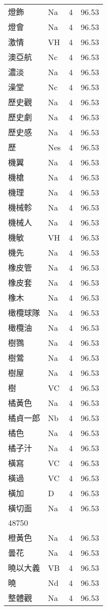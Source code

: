 \documentclass[twocolumn]{book}
\begin{document}
\begin{supertabular}{llrr}
燈飾 & Na & 4 &  96.53\\
燈會 & Na & 4 &  96.53\\
激情 & VH & 4 &  96.53\\
澳亞航 & Nc & 4 &  96.53\\
濃淡 & Na & 4 &  96.53\\
澡堂 & Nc & 4 &  96.53\\
歷史觀 & Na & 4 &  96.53\\
歷史劇 & Na & 4 &  96.53\\
歷史感 & Na & 4 &  96.53\\
歷 & Nes & 4 &  96.53\\
機翼 & Na & 4 &  96.53\\
機槍 & Na & 4 &  96.53\\
機理 & Na & 4 &  96.53\\
機械軫 & Na & 4 &  96.53\\
機械人 & Na & 4 &  96.53\\
機敏 & VH & 4 &  96.53\\
機先 & Na & 4 &  96.53\\
橡皮管 & Na & 4 &  96.53\\
橡皮套 & Na & 4 &  96.53\\
橡木 & Na & 4 &  96.53\\
橄欖球隊 & Na & 4 &  96.53\\
橄欖油 & Na & 4 &  96.53\\
樹鷚 & Na & 4 &  96.53\\
樹鶯 & Na & 4 &  96.53\\
樹屋 & Na & 4 &  96.53\\
樹 & VC & 4 &  96.53\\
橘黃色 & Na & 4 &  96.53\\
橘貞一郎 & Nb & 4 &  96.53\\
橘色 & Na & 4 &  96.53\\
橘子汁 & Na & 4 &  96.53\\
橫寫 & VC & 4 &  96.53\\
橫過 & VC & 4 &  96.53\\
橫加 & D & 4 &  96.53\\
橫切面 & Na & 4 &  96.53\\
48750\\
橙黃色 & Na & 4 &  96.53\\
曇花 & Na & 4 &  96.53\\
曉以大義 & VB & 4 &  96.53\\
曉 & Nd & 4 &  96.53\\
整體觀 & Na & 4 &  96.53\\

\end{supertabular}
\end{document}
